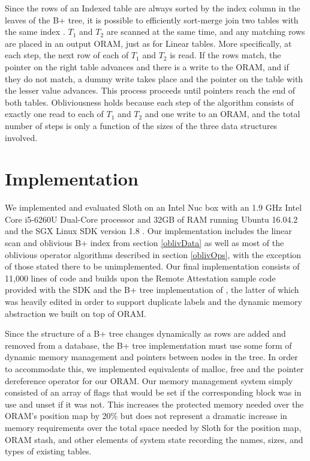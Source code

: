 \documentclass[USenglish,oneside,twocolumn]{article}
\def\name/{Sloth}
\begin{document}
Since the rows of an Indexed table are always sorted by the index column in the leaves of the B+ tree, it is possible to efficiently sort-merge join two tables with the same index \cite{EN10}. $T_1$ and $T_2$ are scanned at the same time, and any matching rows are placed in an output ORAM, just as for Linear tables. More specifically, at each step, the next row of each of $T_1$ and $T_2$ is read. If the rows match, the pointer on the right table advances and there is a write to the ORAM, and if they do not match, a dummy write takes place and the pointer on the table with the lesser value advances. This process proceeds until pointers reach the end of both tables. Obliviousness holds because each step of the algorithm consists of exactly one read to each of $T_1$ and $T_2$ and one write to an ORAM, and the total number of steps is only a function of the sizes of the three data structures involved.  

\section{Implementation}\label{imp}
We implemented and evaluated \name/ on an Intel Nuc box with an 1.9 GHz Intel Core i5-6260U Dual-Core processor and 32GB of RAM running Ubuntu 16.04.2 and the SGX Linux SDK version 1.8 \cite{SGXRef}. Our implementation includes the linear scan and oblivious B+ index from section \ref{oblivData} as well as most of the oblivious operator algorithms described in section \ref{oblivOps}, with the exception of those stated there to be unimplemented. Our final implementation consists of 11,000 lines of code and builds upon the Remote Attestation sample code provided with the SDK and the B+ tree implementation of \cite{BPlus}, the latter of which was heavily edited in order to support duplicate labels and the dynamic memory abstraction we built on top of ORAM. 

Since the structure of a B+ tree changes dynamically as rows are added and removed from a database, the B+ tree implementation must use some form of dynamic memory management and pointers between nodes in the tree. In order to accommodate this, we implemented equivalents of malloc, free and the pointer dereference operator for our ORAM. Our memory management system simply consisted of an array of flags that would be set if the corresponding block was in use and unset if it was not. This increases the protected memory needed over the ORAM's position map by 20\% but does not represent a dramatic increase in memory requirements over the total space needed by \name/ for the position map, ORAM stash, and other elements of system state recording the names, sizes, and types of existing tables. 
\end{document}
